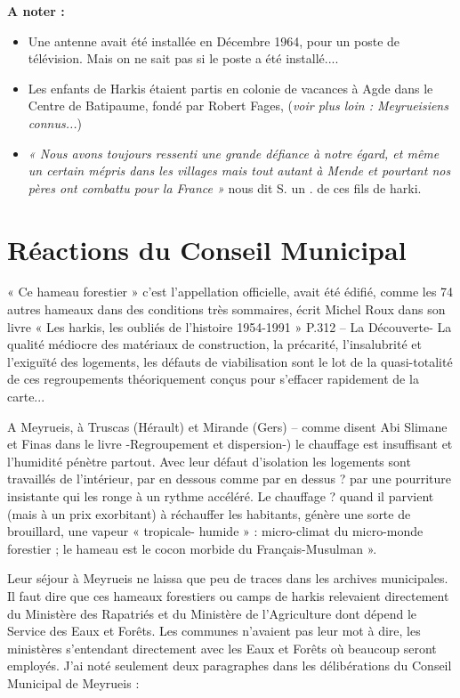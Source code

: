 \textbf{A noter :}

\begin{itemize}
    \item Une antenne avait été installée en Décembre 1964, pour un poste de télévision.
    Mais on ne sait pas si le poste a été installé....
    
    \item Les enfants de Harkis étaient partis en colonie de vacances à Agde dans le
    Centre de Batipaume, fondé par Robert Fages, (\textit{voir plus loin : Meyrueisiens
    connus...})
    
    \item \textit{« Nous avons toujours ressenti une grande défiance à notre égard, et même un certain mépris
    dans les villages mais tout autant à Mende et pourtant nos pères ont combattu pour la
    France »} nous dit S. un . de ces fils de harki.
\end{itemize}

\section{Réactions du Conseil Municipal}

« Ce hameau forestier » c’est l’appellation officielle, avait été édifié, comme les 74
autres hameaux dans des conditions très sommaires, écrit Michel Roux dans son livre
« Les harkis, les oubliés de l’histoire 1954-1991 » P.312 – La Découverte- La qualité médiocre
des matériaux de construction, la précarité, l’insalubrité et l’exiguïté des logements,
les défauts de viabilisation sont le lot de la quasi-totalité de ces regroupements
théoriquement conçus pour s’effacer rapidement de la carte...

A Meyrueis, à Truscas (Hérault) et Mirande (Gers) – comme disent Abi Slimane et Finas
dans le livre -Regroupement et dispersion-) le chauffage est insuffisant et l’humidité pénètre
partout. Avec leur défaut d’isolation les logements sont travaillés de l’intérieur, par
en dessous comme par en dessus ? par une pourriture insistante qui les ronge à un
rythme accéléré. Le chauffage ? quand il parvient (mais à un prix exorbitant) à
réchauffer les habitants, génère une sorte de brouillard, une vapeur « tropicale-
humide » : micro-climat du micro-monde forestier ; le hameau est le cocon morbide
du Français-Musulman ».

Leur séjour à Meyrueis ne laissa que peu de traces dans les archives municipales. Il
faut dire que ces hameaux forestiers ou camps de harkis relevaient directement du
Ministère des Rapatriés et du Ministère de l’Agriculture dont dépend le Service des
Eaux et Forêts. Les communes n’avaient pas leur mot à dire, les ministères
s’entendant directement avec les Eaux et Forêts où beaucoup seront employés. J’ai
noté seulement deux paragraphes dans les délibérations du Conseil Municipal de
Meyrueis :

